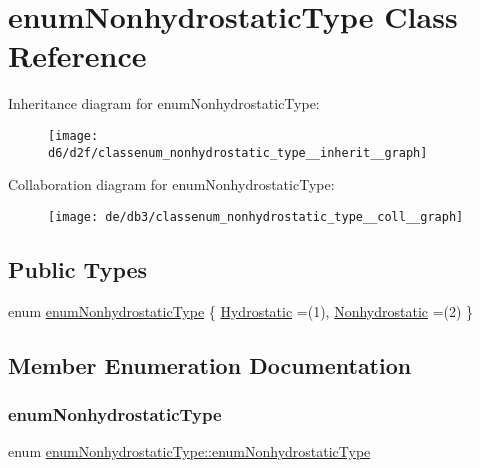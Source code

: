 \hypertarget{classenum_nonhydrostatic_type}{}\section{enum\+Nonhydrostatic\+Type Class Reference}
\label{classenum_nonhydrostatic_type}


Inheritance diagram for enum\+Nonhydrostatic\+Type\+:
\nopagebreak
\begin{figure}[H]
\begin{center}
\leavevmode
\texttt{[image: d6/d2f/classenum\_nonhydrostatic\_type\_\_inherit\_\_graph]}
\end{center}
\end{figure}


Collaboration diagram for enum\+Nonhydrostatic\+Type\+:
\nopagebreak
\begin{figure}[H]
\begin{center}
\leavevmode
\texttt{[image: de/db3/classenum\_nonhydrostatic\_type\_\_coll\_\_graph]}
\end{center}
\end{figure}
\subsection*{Public Types}
\begin{DoxyCompactItemize}
\item 
enum \hyperlink{classenum_nonhydrostatic_type_ac6a02e729b129d758cf20ef70e9a67e0}{enum\+Nonhydrostatic\+Type} \{ \hyperlink{classenum_nonhydrostatic_type_ac6a02e729b129d758cf20ef70e9a67e0a602e5ea767f1d44caf993e32c2188fb8}{Hydrostatic} =(1), 
\hyperlink{classenum_nonhydrostatic_type_ac6a02e729b129d758cf20ef70e9a67e0a6095f74eec73107f2cb933c57a4e01fd}{Nonhydrostatic} =(2)
 \}
\end{DoxyCompactItemize}


\subsection{Member Enumeration Documentation}
\mbox{\label{classenum_nonhydrostatic_type_ac6a02e729b129d758cf20ef70e9a67e0}} 
\subsubsection{\texorpdfstring{enum\+Nonhydrostatic\+Type}{enumNonhydrostaticType}}
{\footnotesize\ttfamily enum \hyperlink{classenum_nonhydrostatic_type_ac6a02e729b129d758cf20ef70e9a67e0}{enum\+Nonhydrostatic\+Type\+::enum\+Nonhydrostatic\+Type}}

